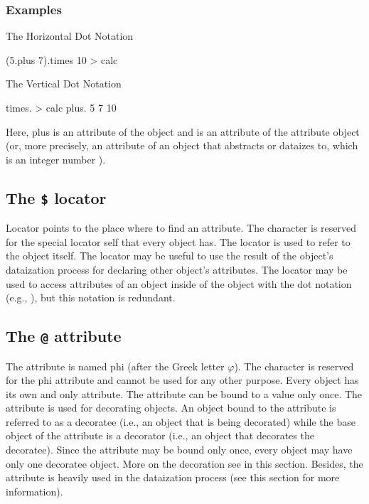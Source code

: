 \documentclass[12pt]{book}
\begin{document}
\subsubsection{Examples}

The Horizontal Dot Notation
\begin{ffcode}
(5.plus 7).times 10 > calc
\end{ffcode}
The Vertical Dot Notation
\begin{ffcode}
times. > calc
  plus.
    5
    7
  10
\end{ffcode}

Here, plus is an attribute of the object  and  is an attribute of the attribute object  (or, more precisely, an attribute of an object that  abstracts or dataizes to, which is an integer number ).

\subsection{The \texttt{\$} locator}
Locator points to the place where to find an attribute. The \ff{$} character is reserved for the special locator self that every object has. The \ff{$} locator is used to refer to the object itself.
The \ff{$} locator may be useful to use the result of the object's dataization process for declaring other object's attributes.
The \ff{$} locator may be used to access attributes of an object inside of the object with the dot notation (e.g., ), but this notation is redundant.

\subsection{The \texttt{@} attribute}
The  attribute is named phi (after the Greek letter $\varphi$). The  character is reserved for the phi attribute and cannot be used for any other purpose. Every object has its own and only  attribute. The  attribute can be bound to a value only once.
The  attribute is used for decorating objects. An object bound to the  attribute is referred to as a decoratee (i.e., an object that is being decorated) while the base object of the  attribute is a decorator (i.e., an object that decorates the decoratee). Since the  attribute may be bound only once, every object may have only one decoratee object. More on the decoration see in this section.
Besides, the  attribute is heavily used in the dataization process (see this section for more information).
\end{document}
